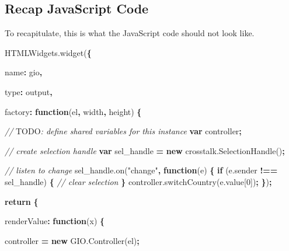 \documentclass[
]{krantz}
\makeatletter
\newenvironment{Shaded}{\begin{snugshade}}{\end{snugshade}}
\newcommand{\AlertTok}[1]{\textcolor[rgb]{0.33,0.33,0.33}{#1}}
\newcommand{\AttributeTok}[1]{\textcolor[rgb]{0.61,0.61,0.61}{#1}}
\newcommand{\CommentTok}[1]{\textcolor[rgb]{0.37,0.37,0.37}{\textit{#1}}}
\newcommand{\ControlFlowTok}[1]{\textcolor[rgb]{0.27,0.27,0.27}{\textbf{#1}}}
\newcommand{\DataTypeTok}[1]{\textcolor[rgb]{0.27,0.27,0.27}{#1}}
\newcommand{\DecValTok}[1]{\textcolor[rgb]{0.06,0.06,0.06}{#1}}
\newcommand{\KeywordTok}[1]{\textcolor[rgb]{0.27,0.27,0.27}{\textbf{#1}}}
\newcommand{\NormalTok}[1]{#1}
\newcommand{\OperatorTok}[1]{\textcolor[rgb]{0.43,0.43,0.43}{\textbf{#1}}}
\newcommand{\StringTok}[1]{\textcolor[rgb]{0.5,0.5,0.5}{#1}}
\newcommand{\VariableTok}[1]{\textcolor[rgb]{0,0,0}{#1}}
\newenvironment{kframe}{%
\medskip{}
\setlength{\fboxsep}{.8em}
 \def\at@end@of@kframe{}%
 \ifinner\ifhmode%
  \def\at@end@of@kframe{\end{minipage}}%
  \begin{minipage}{\columnwidth}%
 \fi\fi%
 \def\FrameCommand##1{\hskip\@totalleftmargin \hskip-\fboxsep
 \colorbox{shadecolor}{##1}\hskip-\fboxsep
     \hskip-\linewidth \hskip-\@totalleftmargin \hskip\columnwidth}%
 \MakeFramed {\advance\hsize-\width
   \@totalleftmargin\z@ \linewidth\hsize
   \@setminipage}}%
 {\par\unskip\endMakeFramed%
 \at@end@of@kframe}
\renewenvironment{Shaded}{\begin{kframe}}{\end{kframe}}
\makeatother
\begin{document}
\hypertarget{linking-widgets-recap}{%
\subsection{Recap JavaScript Code}\label{linking-widgets-recap}}

To recapitulate, this is what the JavaScript code should not look like.

\begin{Shaded}
\begin{Highlighting}[]
\VariableTok{HTMLWidgets}\NormalTok{.}\AttributeTok{widget}\NormalTok{(}\OperatorTok{\{}

  \DataTypeTok{name}\OperatorTok{:} \StringTok{\textquotesingle{}gio\textquotesingle{}}\OperatorTok{,}

  \DataTypeTok{type}\OperatorTok{:} \StringTok{\textquotesingle{}output\textquotesingle{}}\OperatorTok{,}

  \DataTypeTok{factory}\OperatorTok{:} \KeywordTok{function}\NormalTok{(el}\OperatorTok{,}\NormalTok{ width}\OperatorTok{,}\NormalTok{ height) }\OperatorTok{\{}

    \CommentTok{// }\AlertTok{TODO}\CommentTok{: define shared variables for this instance}
    \KeywordTok{var}\NormalTok{ controller}\OperatorTok{;}

    \CommentTok{// create selection handle}
    \KeywordTok{var}\NormalTok{ sel\_handle }\OperatorTok{=} \KeywordTok{new} \VariableTok{crosstalk}\NormalTok{.}\AttributeTok{SelectionHandle}\NormalTok{()}\OperatorTok{;}

    \CommentTok{// listen to change}
    \VariableTok{sel\_handle}\NormalTok{.}\AttributeTok{on}\NormalTok{(}\StringTok{"change"}\OperatorTok{,} \KeywordTok{function}\NormalTok{(e) }\OperatorTok{\{}
      \ControlFlowTok{if}\NormalTok{ (}\VariableTok{e}\NormalTok{.}\AttributeTok{sender} \OperatorTok{!==}\NormalTok{ sel\_handle) }\OperatorTok{\{}
        \CommentTok{// clear selection}
      \OperatorTok{\}}
      \VariableTok{controller}\NormalTok{.}\AttributeTok{switchCountry}\NormalTok{(}\VariableTok{e}\NormalTok{.}\AttributeTok{value}\NormalTok{[}\DecValTok{0}\NormalTok{])}\OperatorTok{;}
    \OperatorTok{\}}\NormalTok{)}\OperatorTok{;}


    \ControlFlowTok{return} \OperatorTok{\{}

      \DataTypeTok{renderValue}\OperatorTok{:} \KeywordTok{function}\NormalTok{(x) }\OperatorTok{\{}

\NormalTok{        controller }\OperatorTok{=} \KeywordTok{new} \VariableTok{GIO}\NormalTok{.}\AttributeTok{Controller}\NormalTok{(el)}\OperatorTok{;}


\end{Highlighting}
\end{Shaded}
\end{document}
